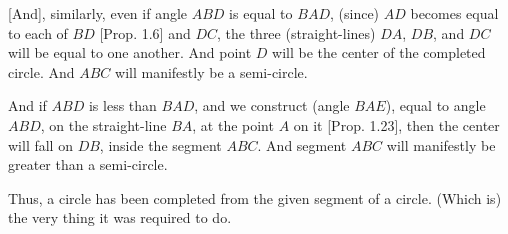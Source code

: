 \begin{Parallel}{}{}
{\mbox{[}And], similarly, even if angle $ABD$ is equal to $BAD$,  (since) $AD$ becomes equal to
 each of $BD$ [Prop. 1.6] and $DC$, the three (straight-lines) $DA$, $DB$, and $DC$
 will  be equal to one another. And point $D$ will be the center of the completed
 circle. And $ABC$ will manifestly be a semi-circle.
 
 And if $ABD$ is less than $BAD$, and we construct (angle $BAE$), equal to angle
 $ABD$,  on the straight-line $BA$, at the point $A$ on it [Prop. 1.23], then
 the center will fall on $DB$,  inside the segment $ABC$. And segment
 $ABC$ will manifestly be greater than a semi-circle.
 
 Thus, a circle has been completed from the given segment of a circle. (Which is) the very thing it was required to do.}
\end{Parallel}

